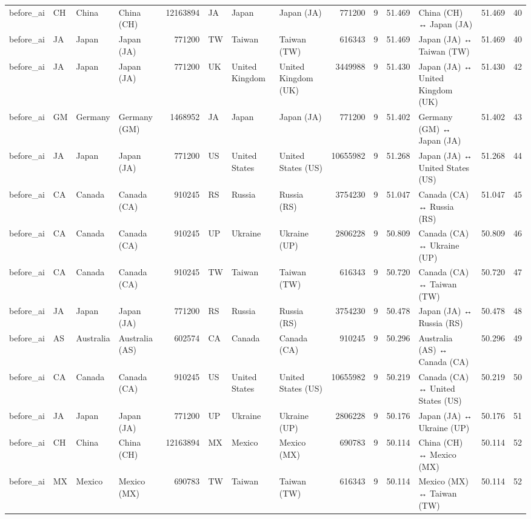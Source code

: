 \begin{tabular}{llllrlllrrrlrr}
before\_ai & CH & China & China (CH) & 12163894 & JA & Japan & Japan (JA) & 771200 & 9 & 51.469 & China (CH) ↔ Japan (JA) & 51.469 & 40 \\
before\_ai & JA & Japan & Japan (JA) & 771200 & TW & Taiwan & Taiwan (TW) & 616343 & 9 & 51.469 & Japan (JA) ↔ Taiwan (TW) & 51.469 & 40 \\
before\_ai & JA & Japan & Japan (JA) & 771200 & UK & United Kingdom & United Kingdom (UK) & 3449988 & 9 & 51.430 & Japan (JA) ↔ United Kingdom (UK) & 51.430 & 42 \\
before\_ai & GM & Germany & Germany (GM) & 1468952 & JA & Japan & Japan (JA) & 771200 & 9 & 51.402 & Germany (GM) ↔ Japan (JA) & 51.402 & 43 \\
before\_ai & JA & Japan & Japan (JA) & 771200 & US & United States & United States (US) & 10655982 & 9 & 51.268 & Japan (JA) ↔ United States (US) & 51.268 & 44 \\
before\_ai & CA & Canada & Canada (CA) & 910245 & RS & Russia & Russia (RS) & 3754230 & 9 & 51.047 & Canada (CA) ↔ Russia (RS) & 51.047 & 45 \\
before\_ai & CA & Canada & Canada (CA) & 910245 & UP & Ukraine & Ukraine (UP) & 2806228 & 9 & 50.809 & Canada (CA) ↔ Ukraine (UP) & 50.809 & 46 \\
before\_ai & CA & Canada & Canada (CA) & 910245 & TW & Taiwan & Taiwan (TW) & 616343 & 9 & 50.720 & Canada (CA) ↔ Taiwan (TW) & 50.720 & 47 \\
before\_ai & JA & Japan & Japan (JA) & 771200 & RS & Russia & Russia (RS) & 3754230 & 9 & 50.478 & Japan (JA) ↔ Russia (RS) & 50.478 & 48 \\
before\_ai & AS & Australia & Australia (AS) & 602574 & CA & Canada & Canada (CA) & 910245 & 9 & 50.296 & Australia (AS) ↔ Canada (CA) & 50.296 & 49 \\
before\_ai & CA & Canada & Canada (CA) & 910245 & US & United States & United States (US) & 10655982 & 9 & 50.219 & Canada (CA) ↔ United States (US) & 50.219 & 50 \\
before\_ai & JA & Japan & Japan (JA) & 771200 & UP & Ukraine & Ukraine (UP) & 2806228 & 9 & 50.176 & Japan (JA) ↔ Ukraine (UP) & 50.176 & 51 \\
before\_ai & CH & China & China (CH) & 12163894 & MX & Mexico & Mexico (MX) & 690783 & 9 & 50.114 & China (CH) ↔ Mexico (MX) & 50.114 & 52 \\
before\_ai & MX & Mexico & Mexico (MX) & 690783 & TW & Taiwan & Taiwan (TW) & 616343 & 9 & 50.114 & Mexico (MX) ↔ Taiwan (TW) & 50.114 & 52 \\

\end{tabular}
